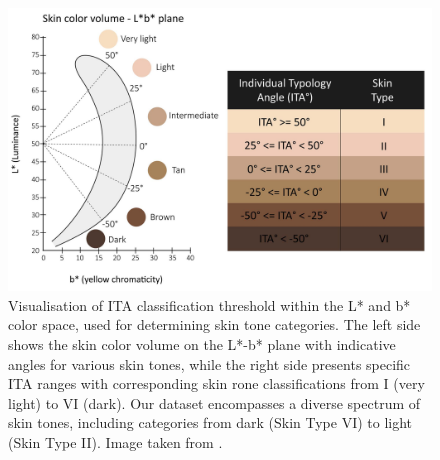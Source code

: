 \begin{spacing}{1.5}
\begin{table}[t!]
    \caption{Summary of Dataset Statistics}
    \label{tbl:dataset_summary}
\end{table}
\begin{figure}[t!]
    \centering
    \includegraphics[width=0.97\columnwidth]{Chapter4/ITA.jpg}
    \caption{Visualisation of ITA classification threshold within the L* and b* color space, used for determining skin tone categories. The left side shows the skin color volume on the L*-b* plane with indicative angles for various skin tones, while the right side presents specific ITA ranges with corresponding skin rone classifications from I (very light) to VI (dark). Our dataset encompasses a diverse spectrum of skin tones, including categories from dark (Skin Type VI) to light (Skin Type II). Image taken from \cite{krishnapriyaAnalysisManualAutomated2022a}.}
    \label{fig:ita}
\end{figure}


\end{spacing}
